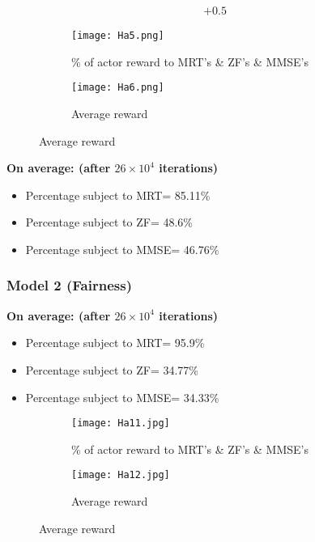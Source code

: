 \begin{enumerate}
\begin{equation}
\begin{aligned}
            & + {0}.{5}
        \end{aligned}
    \end{equation}
    \begin{figure}[H]
        \centering
        \begin{subfigure}{.5\textwidth}
          \centering
          \texttt{[image: Ha5.png]}
          \caption{\% of actor reward to MRT's \& ZF's \& MMSE's}
          \label{fig:highSNR Model1-reshaped}
        \end{subfigure}%
        \begin{subfigure}{.5\textwidth}
          \centering
          \texttt{[image: Ha6.png]}
          \caption{Average reward}
          \label{fig:highSNR Model1_1-reshaped}
        \end{subfigure}
    \end{figure}
    \textbf{On average: (after $26 \times {10}^4$ iterations)}
    \begin{itemize}
        \item Percentage subject to MRT= 85.11\%
        \item Percentage subject to ZF= 48.6\%
        \item Percentage subject to MMSE= 46.76\%
    \end{itemize}
\end{enumerate}

\subsubsection{Model 2 (Fairness)}
\textbf{On average: (after $26 \times {10}^4$ iterations)}
\begin{itemize}
    \item Percentage subject to MRT= 95.9\%
    \item Percentage subject to ZF= 34.77\%
    \item Percentage subject to MMSE= 34.33\%
\end{itemize}
\begin{figure}[H]
    \centering
    \begin{subfigure}{.5\textwidth}
      \centering
      \texttt{[image: Ha11.jpg]}
      \caption{\% of actor reward to MRT's \& ZF's \& MMSE's}
      \label{fig:highSNR Model1-reshaped}
    \end{subfigure}%
    \begin{subfigure}{.5\textwidth}
      \centering
      \texttt{[image: Ha12.jpg]}
      \caption{Average reward}
      \label{fig:highSNR Model1_1-reshaped}
    \end{subfigure}
\end{figure}


